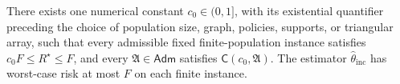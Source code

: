 There exists one numerical constant \(c_0\in(0,1]\), with its existential quantifier preceding the choice of population size, graph, policies, supports, or triangular array, such that every admissible fixed finite-population instance satisfies \(c_0F\le R^{\star}\le F\), and every \(\mathfrak A\in\mathsf{Adm}\) satisfies \(\mathsf C(c_0,\mathfrak A)\). The estimator \(\widehat\theta_{\mathrm{inc}}\) has worst-case risk at most \(F\) on each finite instance.